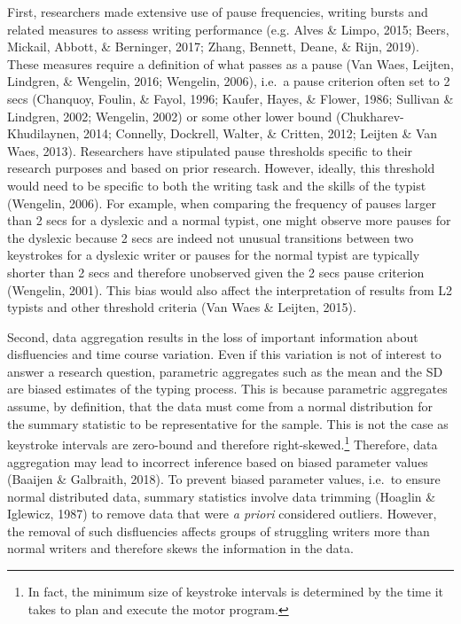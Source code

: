 \documentclass[english,man,floatsintext]{apa7}
\begin{document}
First, researchers made extensive use of pause frequencies, writing bursts and related measures to assess writing performance (e.g. Alves \& Limpo, 2015; Beers, Mickail, Abbott, \& Berninger, 2017; Zhang, Bennett, Deane, \& Rijn, 2019). These measures require a definition of what passes as a pause (Van Waes, Leijten, Lindgren, \& Wengelin, 2016; Wengelin, 2006), i.e.~a pause criterion often set to 2 secs (Chanquoy, Foulin, \& Fayol, 1996; Kaufer, Hayes, \& Flower, 1986; Sullivan \& Lindgren, 2002; Wengelin, 2002) or some other lower bound (Chukharev-Khudilaynen, 2014; Connelly, Dockrell, Walter, \& Critten, 2012; Leijten \& Van Waes, 2013). Researchers have stipulated pause thresholds specific to their research purposes and based on prior research. However, ideally, this threshold would need to be specific to both the writing task and the skills of the typist (Wengelin, 2006). For example, when comparing the frequency of pauses larger than 2 secs for a dyslexic and a normal typist, one might observe more pauses for the dyslexic because 2 secs are indeed not unusual transitions between two keystrokes for a dyslexic writer or pauses for the normal typist are typically shorter than 2 secs and therefore unobserved given the 2 secs pause criterion (Wengelin, 2001). This bias would also affect the interpretation of results from L2 typists and other threshold criteria (Van Waes \& Leijten, 2015).

Second, data aggregation results in the loss of important information about disfluencies and time course variation. Even if this variation is not of interest to answer a research question, parametric aggregates such as the mean and the SD are biased estimates of the typing process. This is because parametric aggregates assume, by definition, that the data must come from a normal distribution for the summary statistic to be representative for the sample. This is not the case as keystroke intervals are zero-bound and therefore right-skewed.\footnote{In fact, the minimum size of keystroke intervals is determined by the time it takes to plan and execute the motor program.} Therefore, data aggregation may lead to incorrect inference based on biased parameter values (Baaijen \& Galbraith, 2018). To prevent biased parameter values, i.e.~to ensure normal distributed data, summary statistics involve data trimming (Hoaglin \& Iglewicz, 1987) to remove data that were \emph{a priori} considered outliers. However, the removal of such disfluencies affects groups of struggling writers more than normal writers and therefore skews the information in the data.
\end{document}
